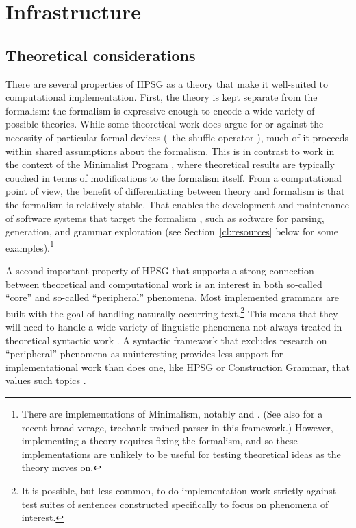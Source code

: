 \documentclass[output=paper,nonflat]{langsci/langscibook}
\begin{document}
\section{Infrastructure}
\label{cl:infrastructure}

\subsection{Theoretical considerations}
\label{cl:theoretical}

There are several properties of HPSG as a theory that make it well-suited to computational implementation.
First, the theory is kept separate from the formalism:
the formalism is expressive enough to encode a wide variety of possible theories.
While some theoretical work does argue for or against the necessity of particular formal devices
(\eg\ the shuffle operator \citep{Reape94a}),
much of it proceeds within shared assumptions about the formalism.
This is in contrast to work in the context of the Minimalist Program \citep{Chomsky95a-u},
where theoretical results are typically couched in terms of modifications to the formalism itself.
From a computational point of view, the benefit of differentiating between theory and formalism
is that the formalism is relatively stable.
That enables the development and maintenance of software systems that target the formalism \citep{boguraev1988software},
such as software for parsing, generation, and grammar exploration
(see Section~\ref{cl:resources} below for some examples).\footnote{%
	There are implementations of Minimalism, notably \citealt{Stabler97a-u} and \citealt{Herring:16}. (See also \citealt{Tor:Sta:Ste:19} for a recent broad-verage, treebank-trained parser in this framework.)
	However, implementing a theory requires fixing the formalism,
	and so these implementations are unlikely to be useful for testing theoretical ideas as the theory moves on.
}

A second important property of HPSG that supports a strong connection between theoretical and computational work is an interest in both so-called ``core'' and so-called ``peripheral'' phenomena. Most implemented grammars are built with the goal of handling naturally occurring text.\footnote{It is possible, but less common, to do implementation work strictly against test suites of sentences constructed specifically to focus on phenomena of interest.} This means that they will need to handle a wide variety of linguistic phenomena not always treated in theoretical syntactic work \citep{Baldwin-et-al-05}. A syntactic framework that excludes research on ``peripheral'' phenomena as uninteresting provides less support for implementational work than does one, like HPSG or Construction Grammar, that values such topics
.
\end{document}
